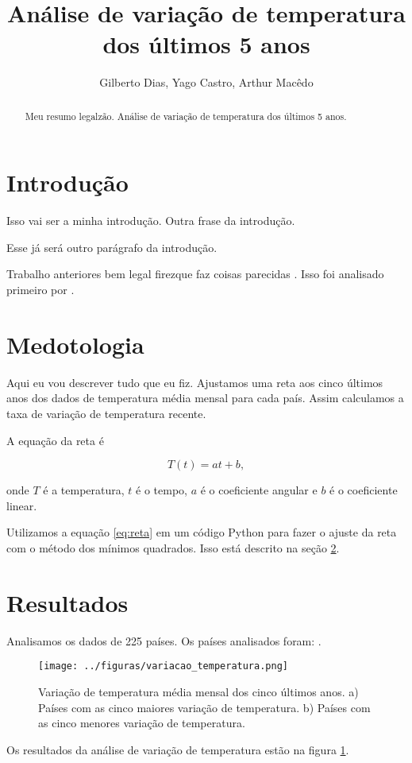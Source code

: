 \documentclass{article}
\newcommand{\Title}{Análise de variação de temperatura dos últimos 5 anos}
\begin{document}

\title{\Title}
\author{Gilberto Dias, Yago Castro, Arthur Macêdo}

\maketitle

\begin{abstract}
Meu resumo legalzão. \Title.
\end{abstract}

\section{Introdução}
Isso vai ser a minha introdução. 
Outra frase da introdução. 

Esse já será outro parágrafo da introdução.

Trabalho anteriores bem legal firezque faz coisas parecidas
\citep{Hansen2010}.
Isso foi analisado primeiro por \citet{Hansen2010}.

\section{Medotologia}
\label{sec:metodos}

Aqui eu vou descrever tudo que eu fiz.
Ajustamos uma reta aos cinco últimos anos dos dados
de temperatura média mensal para cada país.
Assim calculamos a taxa de variação de temperatura recente. 

A equação da reta é


\begin{equation}
T (t) = a t + b,
\label{eq:reta}
\end{equation}

\noindent
onde $T$ é a temperatura, $t$ é o tempo, $a$ é o coeficiente angular e 
$b$ é o coeficiente linear.

Utilizamos a equação \ref{eq:reta} em um código Python para fazer o ajuste da
reta com o método dos mínimos quadrados. Isso está descrito na seção \ref{sec:metodos}.

\section{Resultados}

Analisamos os dados de 225 países. 
Os países analisados foram: \Paises.

\begin{figure}[!htb]
	\centering
	\texttt{[image: ../figuras/variacao\_temperatura.png]}
	\caption{
		Variação de temperatura média mensal dos cinco últimos anos.
		a) Países com as cinco maiores variação de temperatura.
		b) Países com as cinco menores variação de temperatura.
	}
	\label{fig:variacao}
\end{figure}

Os resultados da análise de variação de temperatura estão na figura \ref{fig:variacao}.



\end{document}

